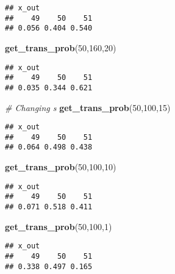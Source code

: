 \documentclass[
]{article}
\newenvironment{Shaded}{\begin{snugshade}}{\end{snugshade}}
\newcommand{\CommentTok}[1]{\textcolor[rgb]{0.56,0.35,0.01}{\textit{#1}}}
\newcommand{\DecValTok}[1]{\textcolor[rgb]{0.00,0.00,0.81}{#1}}
\newcommand{\FunctionTok}[1]{\textcolor[rgb]{0.13,0.29,0.53}{\textbf{#1}}}
\newcommand{\NormalTok}[1]{#1}
\begin{document}
\begin{verbatim}
## x_out
##    49    50    51 
## 0.056 0.404 0.540
\end{verbatim}

\begin{Shaded}
\begin{Highlighting}[]
\FunctionTok{get\_trans\_prob}\NormalTok{(}\DecValTok{50}\NormalTok{,}\DecValTok{160}\NormalTok{,}\DecValTok{20}\NormalTok{)}
\end{Highlighting}
\end{Shaded}

\begin{verbatim}
## x_out
##    49    50    51 
## 0.035 0.344 0.621
\end{verbatim}

\begin{Shaded}
\begin{Highlighting}[]
\CommentTok{\# Changing s}
\FunctionTok{get\_trans\_prob}\NormalTok{(}\DecValTok{50}\NormalTok{,}\DecValTok{100}\NormalTok{,}\DecValTok{15}\NormalTok{)}
\end{Highlighting}
\end{Shaded}

\begin{verbatim}
## x_out
##    49    50    51 
## 0.064 0.498 0.438
\end{verbatim}

\begin{Shaded}
\begin{Highlighting}[]
\FunctionTok{get\_trans\_prob}\NormalTok{(}\DecValTok{50}\NormalTok{,}\DecValTok{100}\NormalTok{,}\DecValTok{10}\NormalTok{)}
\end{Highlighting}
\end{Shaded}

\begin{verbatim}
## x_out
##    49    50    51 
## 0.071 0.518 0.411
\end{verbatim}

\begin{Shaded}
\begin{Highlighting}[]
\FunctionTok{get\_trans\_prob}\NormalTok{(}\DecValTok{50}\NormalTok{,}\DecValTok{100}\NormalTok{,}\DecValTok{1}\NormalTok{)}
\end{Highlighting}
\end{Shaded}

\begin{verbatim}
## x_out
##    49    50    51 
## 0.338 0.497 0.165
\end{verbatim}
\end{document}
